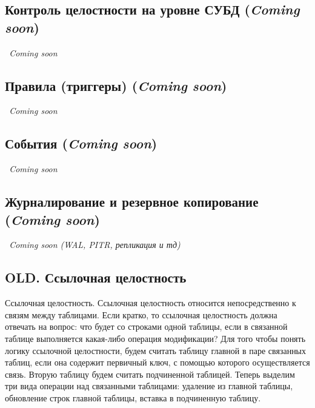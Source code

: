 \subsection{Контроль целостности на уровне СУБД (\textit{Coming soon})}
\textit{~Coming soon}





\subsection{Правила (триггеры) (\textit{Coming soon})}

\textit{~Coming soon}





\subsection{События (\textit{Coming soon})}

\textit{~Coming soon}





\subsection{Журналирование и резервное копирование (\textit{Coming soon})}

\textit{~Coming soon (WAL, PITR, репликация и тд)}
























\subsection{OLD. Ссылочная целостность}

Ссылочная целостность. Ссылочная целостность относится непосредственно к связям между таблицами. Если кратко, то ссылочная целостность должна отвечать на вопрос: что будет со строками одной таблицы, если в связанной таблице выполняется какая-либо операция модификации? Для того чтобы понять логику ссылочной целостности, будем считать таблицу главной в паре связанных таблиц, если она содержит первичный ключ, с помощью которого осуществляется связь. Вторую таблицу будем считать подчиненной таблицей. Теперь выделим три вида операции над связанными таблицами: удаление из главной таблицы, обновление строк главной таблицы, вставка в подчиненную таблицу.

